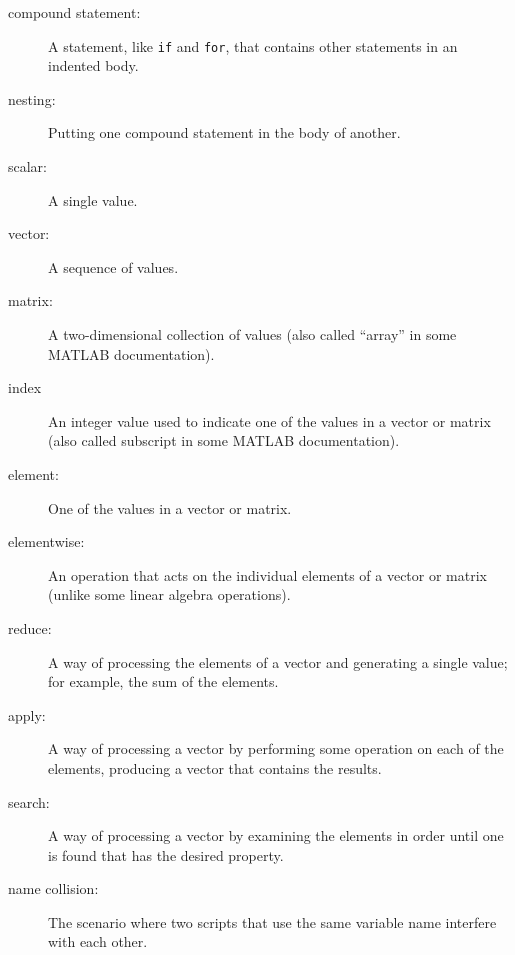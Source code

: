\begin{description}

\item[compound statement:] A statement, like {\tt if} and {\tt for}, that
contains other statements in an indented body.

\item[nesting:] Putting one compound statement in the body of another.




\item[scalar:] A single value.

\item[vector:] A sequence of values.

\item[matrix:] A two-dimensional collection of values (also called
``array'' in some MATLAB documentation).

\item[index] An integer value used to indicate one of the values
in a vector or matrix (also called subscript in some MATLAB documentation).

\item[element:] One of the values in a vector or matrix.

\item[elementwise:] An operation that acts on the individual elements
of a vector or matrix (unlike some linear algebra operations).

\item[reduce:] A way of processing the elements of a vector and
generating a single value; for example, the sum of the elements.

\item[apply:] A way of processing a vector by performing some operation
on each of the elements, producing a vector that contains the
results.

\item[search:] A way of processing a vector by examining the
elements in order until one is found that has the desired property.

\item[name collision:] The scenario where two scripts that use the
same variable name interfere with each other.

\end{description}

